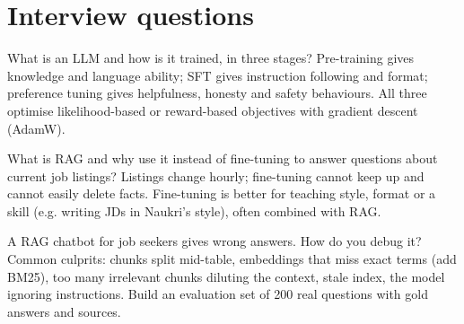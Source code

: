 \section{Interview questions}

\begin{qa}{What is an LLM and how is it trained, in three stages?}
\why Pre-training gives knowledge and language ability; SFT gives instruction following and format; preference tuning gives helpfulness, honesty and safety behaviours. All three
optimise likelihood-based or reward-based objectives with gradient descent (AdamW).
\end{qa}

\begin{qa}{What is RAG and why use it instead of fine-tuning to answer questions about current job listings?}
\why Listings change hourly; fine-tuning cannot keep up and cannot easily delete facts. Fine-tuning is better for teaching style, format or a skill (e.g. writing JDs in Naukri's
style), often combined with RAG.
\end{qa}

\begin{qa}{\deep A RAG chatbot for job seekers gives wrong answers. How do you debug it?}
\why Common culprits: chunks split mid-table, embeddings that miss exact terms (add BM25), too many irrelevant chunks diluting the context, stale index, the model ignoring
instructions. Build an evaluation set of 200 real questions with gold answers and sources.
\end{qa}

